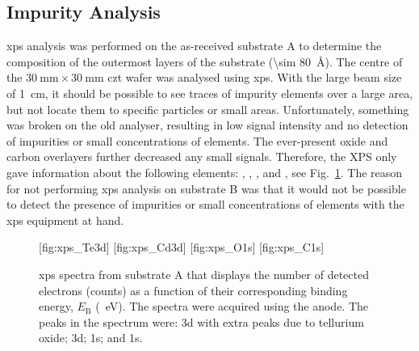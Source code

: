 
\subsection{Impurity Analysis}

\Ac{xps} analysis was performed on the as-received substrate A to determine the composition of the outermost layers of the substrate (\SI{\sim 80}{\angstrom}). The centre of the $\SI{30}{\milli\metre}\times\SI{30}{\milli\metre}$ \ac{czt} wafer was analysed using \ac{xps}. With the large beam size of \SI{1}{\centi\metre}, it should be possible to see traces of impurity elements over a large area, but not locate them to specific particles or small areas. Unfortunately, something was broken on the old analyser, resulting in low signal intensity and no detection of impurities or small concentrations of elements. The ever-present oxide and carbon overlayers further decreased any small signals. Therefore, the XPS only gave information about the following elements: , , , and , see Fig.~\ref{fig:xps_spectra}. The reason for not performing \ac{xps} analysis on substrate B was that it would not be possible to detect the presence of impurities or small concentrations of elements with the \ac{xps} equipment at hand.

\begin{figure}[htbp]
    \centering
    [fig:xps_Te3d]
    [fig:xps_Cd3d]
    [fig:xps_O1s]
    [fig:xps_C1s]
    \caption[\Ac{xps} spectra from substrate A.]{\Acf{xps} spectra from substrate A that displays the number of detected electrons (counts) as a function of their corresponding binding energy, $E_\mathrm{B}$ (\SI{}{\electronvolt}). The spectra were acquired using the  anode. The peaks in the spectrum were:   3d with extra peaks due to tellurium oxide;   3d;   1s; and   1s.}
    \label{fig:xps_spectra}
\end{figure}
 

